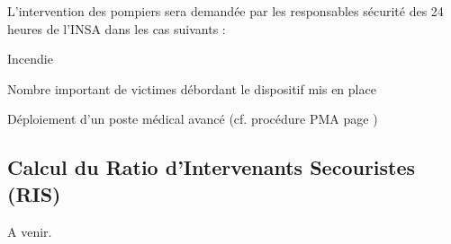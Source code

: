 \documentclass[hidelinks, paper=a4, fontsize=13pt]{report}
\begin{document}
L’intervention des pompiers sera demandée par les responsables sécurité des 24 heures de l'INSA dans les cas suivants :
\begin{list}{•}{}
	\item Incendie
	\item Nombre important de victimes débordant le dispositif mis en place
	\item Déploiement d’un poste médical avancé (cf. procédure PMA page \pageref{refProcedurePMA})
\end{list}

\newpage

\subsection{Calcul du Ratio d’Intervenants Secouristes (RIS)}
A venir.
\end{document}
